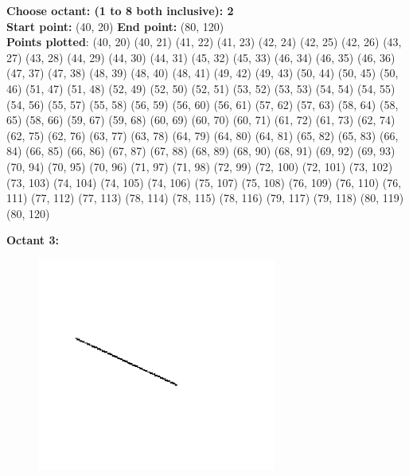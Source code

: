 \documentclass[12pt,letterpaper]{article}
\begin{document}
\textbf{Choose octant: (1 to 8 both inclusive): 2}\\
\textbf{Start point:} (40, 20)
\textbf{End point:} (80, 120)\\
\textbf{Points plotted}: 
(40, 20) (40, 21) (41, 22) (41, 23) 
(42, 24) (42, 25) (42, 26) (43, 27) 
(43, 28) (44, 29) (44, 30) (44, 31) 
(45, 32) (45, 33) (46, 34) (46, 35) 
(46, 36) (47, 37) (47, 38) (48, 39) 
(48, 40) (48, 41) (49, 42) (49, 43) 
(50, 44) (50, 45) (50, 46) (51, 47) 
(51, 48) (52, 49) (52, 50) (52, 51) 
(53, 52) (53, 53) (54, 54) (54, 55) 
(54, 56) (55, 57) (55, 58) (56, 59) 
(56, 60) (56, 61) (57, 62) (57, 63) 
(58, 64) (58, 65) (58, 66) (59, 67) 
(59, 68) (60, 69) (60, 70) (60, 71) 
(61, 72) (61, 73) (62, 74) (62, 75) 
(62, 76) (63, 77) (63, 78) (64, 79) 
(64, 80) (64, 81) (65, 82) (65, 83) 
(66, 84) (66, 85) (66, 86) (67, 87) 
(67, 88) (68, 89) (68, 90) (68, 91) 
(69, 92) (69, 93) (70, 94) (70, 95) 
(70, 96) (71, 97) (71, 98) (72, 99) 
(72, 100) (72, 101) (73, 102) (73, 103) 
(74, 104) (74, 105) (74, 106) (75, 107) 
(75, 108) (76, 109) (76, 110) (76, 111) 
(77, 112) (77, 113) (78, 114) (78, 115) 
(78, 116) (79, 117) (79, 118) (80, 119) 
(80, 120)

\newpage
\textbf{Octant 3:}
\begin{figure}[h]
    \centering
    \includegraphics[height=7cm]{Outputs/O3-1.png}
\end{figure}
\end{document}
